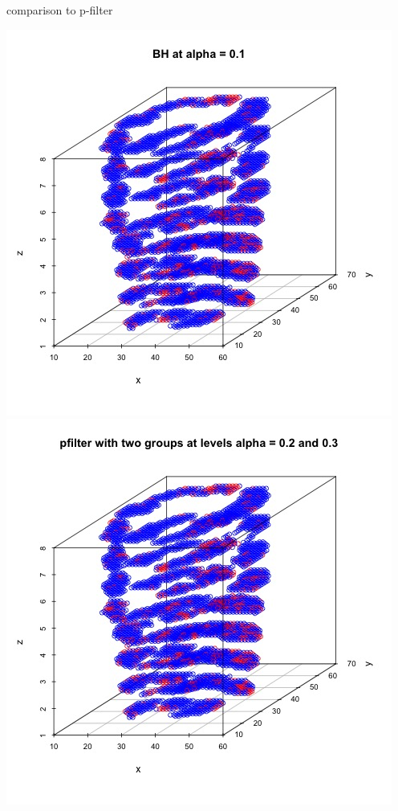 \documentclass[10pt,mathserif]{beamer}
\begin{document}
\begin{frame}{comparison to p-filter}
\begin{center}
\includegraphics[height=0.35\textheight]{../BH_predictions.jpg} \\ 
\includegraphics[height=0.35\textheight]{../pfilter_predictions.jpg} \\ 

\end{center}
\end{frame}
\end{document}
